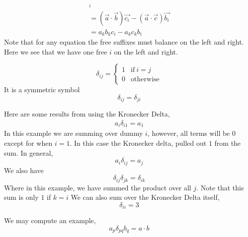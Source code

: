 \documentclass{article}
\numberwithin{equation}{section}
\begin{document}
\begin{eg}
    \begin{align*}
        [(\vec{a} \cdot \vec{b})\vec{c} - (\vec{a}\cdot\vec{c}\vec{b})]_i \tag{Note the single free suffix $i$}\\
        =(\vec{a} \cdot \vec{b})\vec{c_i} - (\vec{a}\cdot\vec{c})\vec{b_i} \\
        =a_kb_kc_i - a_kc_kb_i \tag{Note the use of dummy $k$}
    \end{align*}
    Note that for any equation the free suffixes must balance on the left and right. Here we see that we have one free $i$ on the left and right.
\end{eg}

\begin{defi}
    \[
        \delta_{ij} = \begin{cases}
            1 & \text{if} \ i = j \\
            0 & \text{otherwise}
        \end{cases}
    \]
    It is a symmetric symbol
    \[
        \delta_{ij} = \delta_{ji}
    \]
\end{defi}

\begin{remark}
    Here are some results from using the Kronecker Delta, 
    \begin{align*}
        a_i\delta_{i1} = a_1
    \end{align*}
    In this example we are summing over dummy $i$, however, all terms will be $0$ except for when $i = 1$. In this case the Kronecker delta, pulled out $1$ from the sum. In general,
    \begin{equation}\label{eq:2-33}
        a_i\delta_{ij} = a_j 
    \end{equation}
    We also have
    \begin{equation}\label{eq:2-34}
        \delta_{ij}\delta_{jk} = \delta_{ik}
    \end{equation}
    Where in this example, we have summed the product over all $j$. Note that this sum is only $1$ if $k = i$
    We can also sum over the Kronecker Delta itself,
    \begin{equation}
        \delta_{ii} = 3  
    \end{equation}

    We may compute an example,
    \[
        a_p \delta_{pq} b_q = a \cdot b
    \]
\end{remark}
\end{document}
